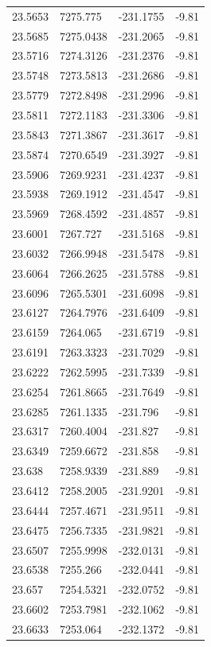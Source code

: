 \begin{table}[H]
\begin{tabular}{llll}
23.5653 & 7275.775 & -231.1755 & -9.81 \\
23.5685 & 7275.0438 & -231.2065 & -9.81 \\
23.5716 & 7274.3126 & -231.2376 & -9.81 \\
23.5748 & 7273.5813 & -231.2686 & -9.81 \\
23.5779 & 7272.8498 & -231.2996 & -9.81 \\
23.5811 & 7272.1183 & -231.3306 & -9.81 \\
23.5843 & 7271.3867 & -231.3617 & -9.81 \\
23.5874 & 7270.6549 & -231.3927 & -9.81 \\
23.5906 & 7269.9231 & -231.4237 & -9.81 \\
23.5938 & 7269.1912 & -231.4547 & -9.81 \\
23.5969 & 7268.4592 & -231.4857 & -9.81 \\
23.6001 & 7267.727 & -231.5168 & -9.81 \\
23.6032 & 7266.9948 & -231.5478 & -9.81 \\
23.6064 & 7266.2625 & -231.5788 & -9.81 \\
23.6096 & 7265.5301 & -231.6098 & -9.81 \\
23.6127 & 7264.7976 & -231.6409 & -9.81 \\
23.6159 & 7264.065 & -231.6719 & -9.81 \\
23.6191 & 7263.3323 & -231.7029 & -9.81 \\
23.6222 & 7262.5995 & -231.7339 & -9.81 \\
23.6254 & 7261.8665 & -231.7649 & -9.81 \\
23.6285 & 7261.1335 & -231.796 & -9.81 \\
23.6317 & 7260.4004 & -231.827 & -9.81 \\
23.6349 & 7259.6672 & -231.858 & -9.81 \\
23.638 & 7258.9339 & -231.889 & -9.81 \\
23.6412 & 7258.2005 & -231.9201 & -9.81 \\
23.6444 & 7257.4671 & -231.9511 & -9.81 \\
23.6475 & 7256.7335 & -231.9821 & -9.81 \\
23.6507 & 7255.9998 & -232.0131 & -9.81 \\
23.6538 & 7255.266 & -232.0441 & -9.81 \\
23.657 & 7254.5321 & -232.0752 & -9.81 \\
23.6602 & 7253.7981 & -232.1062 & -9.81 \\
23.6633 & 7253.064 & -232.1372 & -9.81 \\

\end{tabular}
\end{table}
